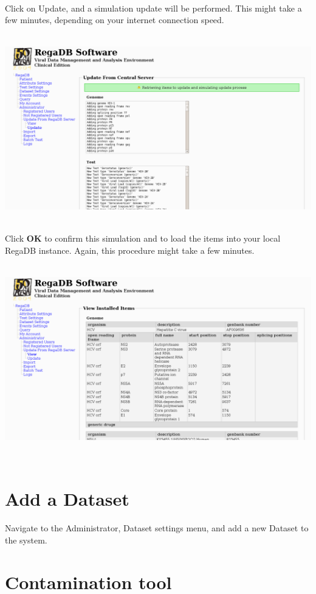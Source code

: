 \\
Click on Update, and a simulation update will be performed. This might take a few minutes, depending on your internet connection speed.
\\
\vspace{0.5cm}~ \\ \centerline{\includegraphics[width=15cm] {pics/auxilary/aux_4.png}}
\\
Click \textbf{OK} to confirm this simulation and to load the items into your local RegaDB instance. Again, this procedure might take a few minutes.
\\
\vspace{0.5cm}~ \\ \centerline{\includegraphics[width=15cm] {pics/auxilary/aux_5.png}}
\\
\section{Add a Dataset}
Navigate to the Administrator, Dataset settings menu, and add a new Dataset to the system.
\section{Contamination tool}
